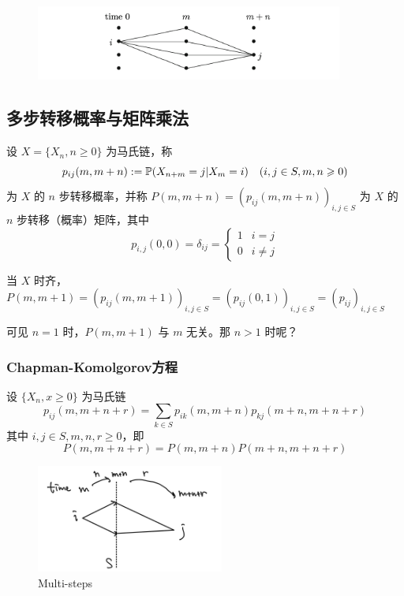 \begin{figure}[H]
    \centering
    \includegraphics[width=0.9\textwidth]{figures/split_steps.png}
\end{figure}

\subsection{多步转移概率与矩阵乘法}

\begin{definition}
    设 $X=\{X_n,n\geq 0\}$ 为马氏链，称
    \[
    p_{ij}(m,m+n):=\mathbb{P}(X_{n+m}=j|X_m=i)\quad (i,j\in S, m,n\geqslant 0)
    \]
    为 $X$ 的 $n$ 步转移概率，并称 $P(m,m+n)=(p_{ij}(m,m+n))_{i,j\in S}$ 为 $X$ 的 $n$ 步转移（概率）矩阵，其中
    \[
    p_{i,j}(0,0)=\delta_{ij}=\begin{cases}
        1 & i=j\\
        0 & i\neq j
    \end{cases}
    \]
\end{definition}

当 $X$ 时齐，$P(m,m+1)=(p_{ij}(m,m+1))_{i,j\in S}=(p_{ij}(0,1))_{i,j\in S}=(p_{ij})_{i,j\in S}$

可见 $n=1$ 时，$P(m,m+1)$ 与 $m$ 无关。那 $n>1$ 时呢？

\subsubsection{Chapman-Komolgorov方程}

\begin{theorem}[C-K方程]
    设 $\{X_n,x\geq 0\}$ 为马氏链
    \[
    p_{ij}(m,m+n+r)=\sum_{k\in S}p_{ik}(m,m+n)p_{kj}(m+n,m+n+r)
    \]
    其中 $i,j\in S,m,n,r\geq 0$，即
    \[
    P(m,m+n+r)=P(m,m+n)P(m+n,m+n+r)
    \]
\end{theorem}

\begin{figure}[H]
    \centering
    \includegraphics[width=0.55\textwidth]{figures/multi_steps.jpg}
    \caption{Multi-steps}
\end{figure}

